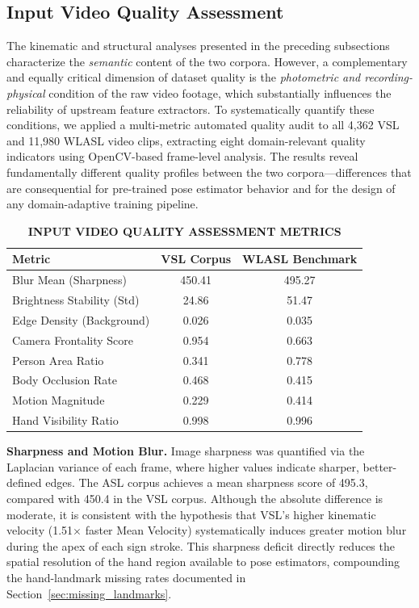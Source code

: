 \documentclass{ieeeaccess}
\DeclareRobustCommand{\textbf}[1]{{\bfseries #1}}
\begin{document}
\subsection{Input Video Quality Assessment}
\label{sec:quality_assessment}

The kinematic and structural analyses presented in the preceding subsections characterize the \textit{semantic} content of the two corpora. However, a complementary and equally critical dimension of dataset quality is the \textit{photometric and recording-physical} condition of the raw video footage, which substantially influences the reliability of upstream feature extractors. To systematically quantify these conditions, we applied a multi-metric automated quality audit to all 4,362 VSL and 11,980 WLASL video clips, extracting eight domain-relevant quality indicators using OpenCV-based frame-level analysis. The results reveal fundamentally different quality profiles between the two corpora—differences that are consequential for pre-trained pose estimator behavior and for the design of any domain-adaptive training pipeline.

\begin{table}[htbp]
\caption{\textbf{INPUT VIDEO QUALITY ASSESSMENT METRICS}}
\centering
\setlength{\tabcolsep}{3pt}
\begin{tabular}{|l|c|c|}
\hline
\textbf{Metric} & \textbf{VSL Corpus} & \textbf{WLASL Benchmark} \\
\hline
Blur Mean (Sharpness) & 450.41 & 495.27 \\
Brightness Stability (Std) & 24.86 & 51.47 \\
Edge Density (Background) & 0.026 & 0.035 \\
Camera Frontality Score & 0.954 & 0.663 \\
Person Area Ratio & 0.341 & 0.778 \\
Body Occlusion Rate & 0.468 & 0.415 \\
Motion Magnitude & 0.229 & 0.414 \\
Hand Visibility Ratio & 0.998 & 0.996 \\
\hline
\end{tabular}
\label{tab:quality}
\end{table}

\textbf{Sharpness and Motion Blur.} Image sharpness was quantified via the Laplacian variance of each frame, where higher values indicate sharper, better-defined edges. The ASL corpus achieves a mean sharpness score of 495.3, compared with 450.4 in the VSL corpus. Although the absolute difference is moderate, it is consistent with the hypothesis that VSL's higher kinematic velocity (1.51$\times$ faster Mean Velocity) systematically induces greater motion blur during the apex of each sign stroke. This sharpness deficit directly reduces the spatial resolution of the hand region available to pose estimators, compounding the hand-landmark missing rates documented in Section~\ref{sec:missing_landmarks}.
\end{document}
